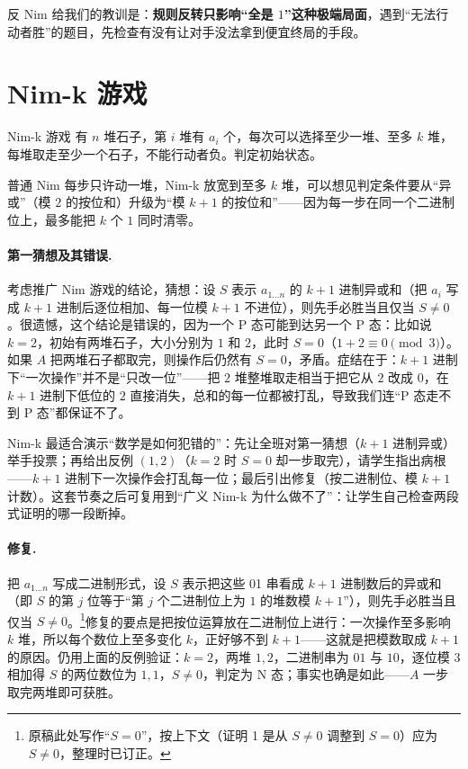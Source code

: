 \documentclass[UTF8,a4paper,11pt,oneside,openany,fontset=fandol]{ctexbook}
\theoremstyle{definition}
\begin{document}
反 Nim 给我们的教训是：\textbf{规则反转只影响“全是 $1$”这种极端局面}，遇到“无法行动者胜”的题目，先检查有没有让对手没法拿到便宜终局的手段。

\section{Nim-k 游戏}
\begin{problem}{Nim-k 游戏}
有 $n$ 堆石子，第 $i$ 堆有 $a_i$ 个，每次可以选择至少一堆、至多 $k$ 堆，每堆取走至少一个石子，不能行动者负。判定初始状态。
\end{problem}

普通 Nim 每步只许动一堆，Nim-k 放宽到至多 $k$ 堆，可以想见判定条件要从“异或”（模 $2$ 的按位和）升级为“模 $k+1$ 的按位和”——因为每一步在同一个二进制位上，最多能把 $k$ 个 $1$ 同时清零。

\paragraph{第一猜想及其错误.} 考虑推广 Nim 游戏的结论，猜想：设 $S$ 表示 $a_{1\ldots n}$ 的 $k+1$ 进制异或和（把 $a_i$ 写成 $k+1$ 进制后逐位相加、每一位模 $k+1$ 不进位），则先手必胜当且仅当 $S\ne0$。很遗憾，这个结论是错误的，因为一个 P 态可能到达另一个 P 态：比如说 $k=2$，初始有两堆石子，大小分别为 $1$ 和 $2$，此时 $S=0$（$1+2\equiv0\pmod 3$）。如果 $A$ 把两堆石子都取完，则操作后仍然有 $S=0$，矛盾。症结在于：$k+1$ 进制下“一次操作”并不是“只改一位”——把 $2$ 堆整堆取走相当于把它从 $2$ 改成 $0$，在 $k+1$ 进制下低位的 $2$ 直接消失，总和的每一位都被打乱，导致我们连“P 态走不到 P 态”都保证不了。

\begin{teach}[猜想--反驳--修复的教学节奏]
Nim-k 最适合演示“数学是如何犯错的”：先让全班对第一猜想（$k+1$ 进制异或）举手投票；再给出反例 $(1,2)$（$k=2$ 时 $S=0$ 却一步取完），请学生指出病根——$k+1$ 进制下一次操作会打乱每一位；最后引出修复（按二进制位、模 $k+1$ 计数）。这套节奏之后可复用到“广义 Nim-k 为什么做不了”：让学生自己检查两段式证明的哪一段断掉。
\end{teach}
\paragraph{修复.} 把 $a_{1\ldots n}$ 写成二进制形式，设 $S$ 表示把这些 01 串看成 $k+1$ 进制数后的异或和（即 $S$ 的第 $j$ 位等于“第 $j$ 个二进制位上为 $1$ 的堆数模 $k+1$”），则先手必胜当且仅当 $S\ne0$。\footnote{原稿此处写作“$S=0$”，按上下文（证明 1 是从 $S\ne0$ 调整到 $S=0$）应为 $S\ne0$，整理时已订正。}修复的要点是把按位运算放在二进制位上进行：一次操作至多影响 $k$ 堆，所以每个数位上至多变化 $k$，正好够不到 $k+1$——这就是把模数取成 $k+1$ 的原因。仍用上面的反例验证：$k=2$，两堆 $1,2$，二进制串为 $01$ 与 $10$，逐位模 $3$ 相加得 $S$ 的两位数位为 $1,1$，$S\ne0$，判定为 N 态；事实也确是如此——$A$ 一步取完两堆即可获胜。
\end{document}
